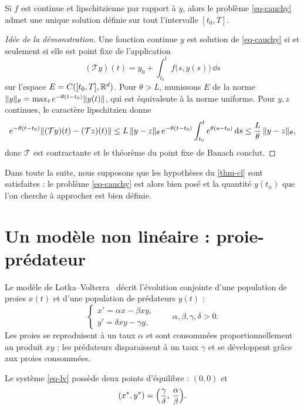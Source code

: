 \begin{theoreme}\label{thm-cl}
Si $f$ est continue et lipschitzienne par rapport à $y$, alors le problème \eqref{eq-cauchy} admet une unique solution définie sur tout l'intervalle $[t_0,T]$.
\end{theoreme}

\begin{proof}[Idée de la démonstration]
Une fonction continue $y$ est solution de \eqref{eq-cauchy} si et seulement si elle est point fixe de l'application
\[
  (\mathcal{T}y)(t)=y_0+\int_{t_0}^{t} f\bigl(s,y(s)\bigr)\,\dd s
\]
sur l'espace $E=C([t_0,T],\mathbb{R}^d)$. Pour $\theta>L$, munissons $E$ de la norme $\lVert y\rVert_\theta=\max_t e^{-\theta(t-t_0)}\lVert y(t)\rVert$, qui est équivalente à la norme uniforme. Pour $y,z$ continues, le caractère lipschitzien donne
\[
  e^{-\theta(t-t_0)}\lVert (\mathcal{T}y)(t)-(\mathcal{T}z)(t)\rVert
  \le L\,\lVert y-z\rVert_\theta\, e^{-\theta(t-t_0)}\int_{t_0}^{t}e^{\theta(s-t_0)}\,\mathrm{d} s
  \le \frac{L}{\theta}\,\lVert y-z\rVert_\theta ,
\]
donc $\mathcal{T}$ est contractante et le théorème du point fixe de Banach conclut.
\end{proof}

Dans toute la suite, nous supposons que les hypothèses du \cref{thm-cl} sont satisfaites : le problème \eqref{eq-cauchy} est alors bien posé et la quantité $y(t_n)$ que l'on cherche à approcher est bien définie.

\section{Un modèle non linéaire : proie-prédateur}\label{sec-lv}

Le modèle de Lotka--Volterra~\cite{lotka1925,volterra1926} décrit l'évolution conjointe d'une population de proies $x(t)$ et d'une population de prédateurs $y(t)$ :
\begin{equation}\label{eq-lv}
  \begin{cases}
    x'=\alpha x-\beta xy,\\[2pt]
    y'=\delta xy-\gamma y,
  \end{cases}
  \qquad \alpha,\beta,\gamma,\delta>0 .
\end{equation}
Les proies se reproduisent à un taux $\alpha$ et sont consommées proportionnellement au produit $xy$ ; les prédateurs disparaissent à un taux $\gamma$ et se développent grâce aux proies consommées.

Le système \eqref{eq-lv} possède deux points d'équilibre : $(0,0)$ et
\[
  (x^\ast,y^\ast)=\Bigl(\frac{\gamma}{\delta},\,\frac{\alpha}{\beta}\Bigr).
\]

